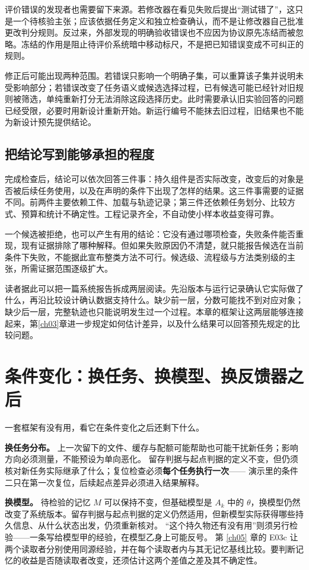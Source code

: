 评价错误的发现者也需要留下来源。若修改器在看见失败后提出“测试错了”，这只是一个待核验主张；应该依据任务定义和独立检查确认，而不是让修改器自己批准更改判分规则。反过来，外部发现的明确验收错误也不应因为协议原先冻结而被忽略。冻结的作用是阻止待评价系统暗中移动标尺，不是把已知错误变成不可纠正的规则。

修正后可能出现两种范围。若错误只影响一个明确子集，可以重算该子集并说明未受影响部分；若错误改变了任务语义或候选选择过程，已有候选可能已经针对旧规则被筛选，单纯重新打分无法消除这段选择历史。此时需要承认旧实验回答的问题已经受限，必要时用新设计重新开始。新运行编号不能抹去旧过程，旧结果也不能为新设计预先提供结论。

\subsection{把结论写到能够承担的程度}

完成检查后，结论可以依次回答三件事：持久组件是否实际改变，改变后的对象是否被后续任务使用，以及在声明的条件下出现了怎样的结果。这三件事需要的证据不同。前两件主要依赖工件、加载与轨迹记录；第三件还依赖任务划分、比较方式、预算和统计不确定性。工程记录齐全，不自动使小样本收益变得可靠。

一个候选被拒绝，也可以产生有用的结论：它没有通过哪项检查，失败条件能否重现，现有证据排除了哪种解释。但如果失败原因仍不清楚，就只能报告候选在当前条件下失败，不能据此宣布整类方法不可行。候选级、流程级与方法类别级的主张，所需证据范围逐级扩大。

读者据此可以把一篇系统报告拆成两层阅读。先沿版本与运行记录确认它实际做了什么，再沿比较设计确认数据支持什么。缺少前一层，分数可能找不到对应对象；缺少后一层，完整轨迹也只能说明发生过一个过程。本章的框架让这两层能够连接起来，第\ref{ch03}章进一步规定如何估计差异，以及什么结果可以回答预先规定的比较问题。


\section{条件变化：换任务、换模型、换反馈器之后}
\label{sec:ch02-conditions}

一套框架有没有用，看它在条件变化之后还剩下什么。

\textbf{换任务分布。}
上一次留下的文件、缓存与配额可能帮助也可能干扰新任务；影响方向必须测量，不能预设为单向恶化。
留存判据与起点判据的定义不变，但仍须核对新任务实际继承了什么；复位检查必须\textbf{每个任务执行一次}——
演示里的条件二只在第一次复位，后续起点差异必须进入结果解释。

\textbf{换模型。}
待检验的记忆 $M$ 可以保持不变，但基础模型是 $A_k$ 中的 $\theta$，换模型仍然改变了系统版本。留存判据与起点判据的定义仍然适用，但新模型实际获得哪些持久信息、从什么状态出发，仍须重新核对。
“这个持久物还有没有用”则须另行检验——一条写给模型甲的经验，在模型乙身上可能反号。
第 \ref{ch05} 章的 E03c 让两个读取者分别使用同源经验，并在每个读取者内与其无记忆基线比较。要判断记忆的收益是否随读取者改变，还须估计这两个差值之差及其不确定性。

